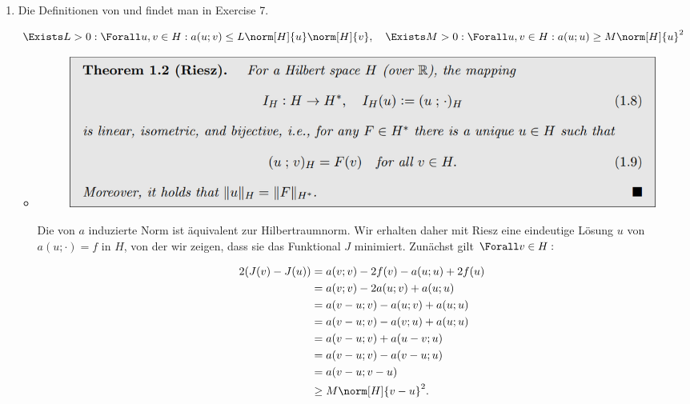 \begin{solution}

\phantom{}

\begin{enumerate}[label = \textbf{\alph*)}]

  \item Die Definitionen von  und  findet man in Exercise 7.

  \begin{align*}
    \Exists L > 0:
    \Forall u, v \in H:
    a(u; v) \leq L \norm[H]{u} \norm[H]{v},
    \quad
    \Exists M > 0:
    \Forall u, v \in H:
    a(u; u) \geq M \norm[H]{u}^2
  \end{align*}

  \begin{itemize}

    \item
    [\Quote{$\implies$:}]

    \begin{figure}[h!]
      \centering
      \includegraphics[width = 0.9 \textwidth]{../../../Fundament-LaTeX/images/NumPDEs/NumPDEs - Theorem 1.2 (Riesz).png}
    \end{figure}

    Die von $a$ induzierte Norm ist äquivalent zur Hilbertraumnorm.
    Wir erhalten daher mit Riesz eine eindeutige Lösung $u$ von $a(u; \cdot) = f$ in $H$, von der wir zeigen, dass sie das Funktional $J$ minimiert.
    Zunächst gilt $\Forall v \in H:$

    \begin{align*}
      2 (J(v) - J(u))
      & =
      a(v; v) - 2f(v) - a(u; u) + 2 f(u) \\
      & =
      a(v; v) -2a(u; v) + a(u; u) \\
      & =
      a(v-u; v) - a(u; v) + a(u; u) \\
      & =
      a(v-u; v) - a(v; u) + a(u; u) \\
      & =
      a(v-u; v) + a(u-v; u) \\
      & =
      a(v-u; v) - a(v-u; u) \\
      & =
      a(v-u; v-u) \\
      & \geq
      M \norm[H]{v-u}^2.
    \end{align*}


\end{itemize}
\end{enumerate}
\end{solution}
